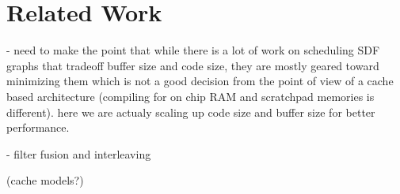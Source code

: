 \section{Related Work}
\label{sec:related-work}


- need to make the point that while there is a lot of work on
  scheduling SDF graphs that tradeoff buffer size and code size, they
  are mostly geared toward minimizing them which is not a good
  decision from the point of view of a cache based architecture
  (compiling for on chip RAM and scratchpad memories is different).
  here we are actualy scaling up code size and buffer size for better
  performance. 

- filter fusion and interleaving

(cache models?)